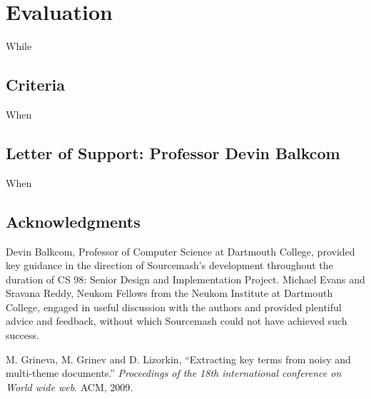 \documentclass[11pt]{article}
\begin{document}

\section{Evaluation}

While

\subsection{Criteria}

When

\subsection{Letter of Support: Professor Devin Balkcom}

When



\subsection*{Acknowledgments}
Devin Balkcom, Professor of Computer Science at Dartmouth College, provided key guidance in the direction of Sourcemash's development throughout the duration of CS 98: Senior Design and Implementation Project. Michael Evans and Sravana Reddy, Neukom Fellows from the Neukom Institute at Dartmouth College, engaged in useful discussion with the authors and provided plentiful advice and feedback, without which Sourcemash could not have achieved such success.


\begin{thebibliography}{99}

  M. Grineva, M. Grinev and D. Lizorkin, ``Extracting key terms from noisy and multi-theme documents.'' \emph{Proceedings of the 18th international conference on World wide web}. ACM, 2009.
\end{thebibliography}
\end{document}

